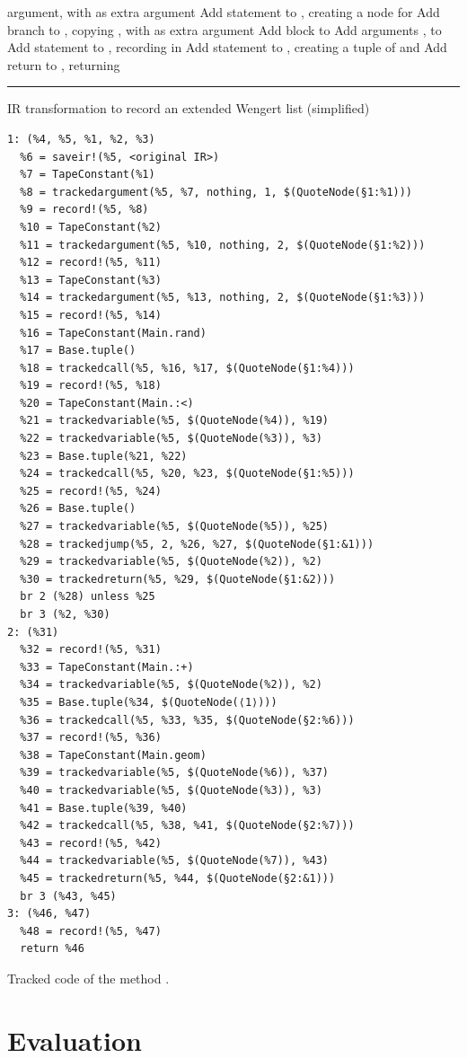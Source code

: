 \begin{algorithm}[p]
\begin{algorithmic}
    argument, with  as extra argument
    \Else
    \State Add statement  to , creating a node for 
    \State Add branch to , copying , with  as
    extra argument
    \EndIf
    \EndFor
    \EndFor
    \Statex
    \State Add block  to 
    \State Add arguments ,  to 
    \State Add statement to , recording  in
    \State Add statement  to , creating a tuple of
     and 
    \State Add return to , returning 
    \EndFunction
  \end{algorithmic}
  \smallskip
  \hrule
  \caption{IR transformation to record an extended Wengert list (simplified) \label{alg:ir-transform}}
\end{algorithm}

\begin{lstfloat}[p]
\begin{lstlisting}[style=lstfloat]
1: (%4, %5, %1, %2, %3)
  %6 = saveir!(%5, <original IR>)
  %7 = TapeConstant(%1)
  %8 = trackedargument(%5, %7, nothing, 1, $(QuoteNode(§1:%1)))
  %9 = record!(%5, %8)
  %10 = TapeConstant(%2)
  %11 = trackedargument(%5, %10, nothing, 2, $(QuoteNode(§1:%2)))
  %12 = record!(%5, %11)
  %13 = TapeConstant(%3)
  %14 = trackedargument(%5, %13, nothing, 2, $(QuoteNode(§1:%3)))
  %15 = record!(%5, %14)
  %16 = TapeConstant(Main.rand)
  %17 = Base.tuple()
  %18 = trackedcall(%5, %16, %17, $(QuoteNode(§1:%4)))
  %19 = record!(%5, %18)
  %20 = TapeConstant(Main.:<)
  %21 = trackedvariable(%5, $(QuoteNode(%4)), %19)
  %22 = trackedvariable(%5, $(QuoteNode(%3)), %3)
  %23 = Base.tuple(%21, %22)
  %24 = trackedcall(%5, %20, %23, $(QuoteNode(§1:%5)))
  %25 = record!(%5, %24)
  %26 = Base.tuple()
  %27 = trackedvariable(%5, $(QuoteNode(%5)), %25)
  %28 = trackedjump(%5, 2, %26, %27, $(QuoteNode(§1:&1)))
  %29 = trackedvariable(%5, $(QuoteNode(%2)), %2)
  %30 = trackedreturn(%5, %29, $(QuoteNode(§1:&2)))
  br 2 (%28) unless %25
  br 3 (%2, %30)
2: (%31)
  %32 = record!(%5, %31)
  %33 = TapeConstant(Main.:+)
  %34 = trackedvariable(%5, $(QuoteNode(%2)), %2)
  %35 = Base.tuple(%34, $(QuoteNode(⟨1⟩)))
  %36 = trackedcall(%5, %33, %35, $(QuoteNode(§2:%6)))
  %37 = record!(%5, %36)
  %38 = TapeConstant(Main.geom)
  %39 = trackedvariable(%5, $(QuoteNode(%6)), %37)
  %40 = trackedvariable(%5, $(QuoteNode(%3)), %3)
  %41 = Base.tuple(%39, %40)
  %42 = trackedcall(%5, %38, %41, $(QuoteNode(§2:%7)))
  %43 = record!(%5, %42)
  %44 = trackedvariable(%5, $(QuoteNode(%7)), %43)
  %45 = trackedreturn(%5, %44, $(QuoteNode(§2:&1)))
  br 3 (%43, %45)
3: (%46, %47)
  %48 = record!(%5, %47)
  return %46
\end{lstlisting}
  \caption{Tracked code of the method \protect{}.\label{lst:geom-tracked}}
\end{lstfloat}


\section{Evaluation}
\label{sec:irtracker-eval}

